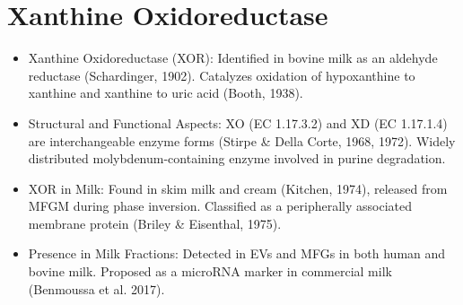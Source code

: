 \section{Xanthine Oxidoreductase}
\begin{itemize}
    \item Xanthine Oxidoreductase (XOR):
    \subitem Identified in bovine milk as an aldehyde reductase (Schardinger, 1902).
    \subitem Catalyzes oxidation of hypoxanthine to xanthine and xanthine to uric acid (Booth, 1938).

    \item Structural and Functional Aspects:
    \subitem XO (EC 1.17.3.2) and XD (EC 1.17.1.4) are interchangeable enzyme forms (Stirpe \& Della Corte, 1968, 1972).
    \subitem Widely distributed molybdenum-containing enzyme involved in purine degradation.

    \item XOR in Milk:
    \subitem Found in skim milk and cream (Kitchen, 1974), released from MFGM during phase inversion.
    \subitem Classified as a peripherally associated membrane protein (Briley \& Eisenthal, 1975).

    \item Presence in Milk Fractions:
    \subitem Detected in EVs and MFGs in both human and bovine milk.
    \subitem Proposed as a microRNA marker in commercial milk (Benmoussa et al. 2017).
\end{itemize}

